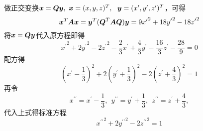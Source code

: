 \begin{frame}
  
    做正交变换${\boldsymbol{x}}=\boldsymbol{Q}{\boldsymbol{y}},~{\boldsymbol{x}}=(x,y,z)^T,~~{\boldsymbol{y}}=(x^\prime,y^\prime,z^\prime)^T$，可得
    $$
    {\boldsymbol{x}}^T\boldsymbol{A}{\boldsymbol{x}}={\boldsymbol{y}}^T(\boldsymbol{Q}^T\boldsymbol{A}\boldsymbol{Q}){\boldsymbol{y}}=9{x^\prime}^2+18{y^\prime}^2-18{z^\prime}^2
    $$\pause
    将${\boldsymbol{x}}=\boldsymbol{Q}{\boldsymbol{y}}$代入原方程即得
    $$
    {x^\prime}^2+2{y^\prime}^2-2{z^\prime}^2-\frac23x^\prime+\frac43y^\prime-\frac{16}3z^\prime-\frac{28}9=0
    $$\pause
    配方得
    $$
    \left(x^\prime-\frac13\right)^2+2\left(y^\prime+\frac13\right)^2-2\left(z^\prime+\frac43\right)^2=1
    $$\pause
    再令
    $$
    x^{\prime\prime}=x^\prime-\frac13,~~
    y^{\prime\prime}=y^\prime+\frac13,~~
    z^{\prime\prime}=z^\prime+\frac43,
    $$
    代入上式得标准方程
    $$
    {x^{\prime\prime}}^2+2{y^{\prime\prime}}^2-2{z^{\prime\prime}}^2=1
    $$
  
\end{frame}
